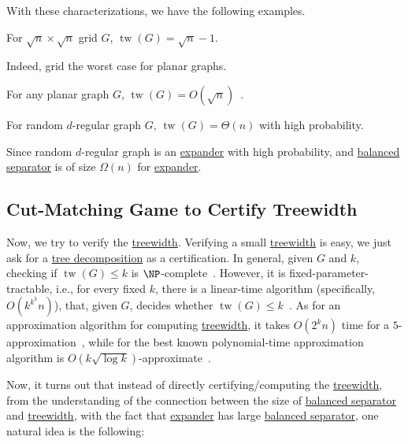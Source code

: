 With these characterizations, we have the following examples.

\begin{eg}[Grid]
	For \(\sqrt{n} \times \sqrt{n} \) grid \(G\), \(\operatorname{tw}(G) = \sqrt{n} - 1 \).
\end{eg}

Indeed, grid the worst case for planar graphs.

\begin{eg}\label{eg:planar-separator-theorem}
	For any planar graph \(G\), \(\operatorname{tw}(G) = O(\sqrt{n} )\)~\cite{lipton1979separator}.
\end{eg}

\begin{eg}
	For random \(d\)-regular graph \(G\), \(\operatorname{tw}(G) = \Theta (n)\) with high probability.
\end{eg}
\begin{explanation}
	Since random \(d\)-regular graph is an \hyperref[def:expander]{expander} with high probability, and \hyperref[def:balanced-separator]{balanced separator} is of size \(\Omega (n)\) for \hyperref[def:expander]{expander}.
\end{explanation}

\subsection{Cut-Matching Game to Certify Treewidth}
Now, we try to verify the \hyperref[def:treewidth]{treewidth}. Verifying a small \hyperref[def:treewidth]{treewidth} is easy, we just ask for a \hyperref[def:tree-decomposition]{tree decomposition} as a certification. In general, given \(G\) and \(k\), checking if \(\operatorname{tw}(G) \leq k\) is \(\NP\)-complete~\cite{arnborg1987complexity}. However, it is fixed-parameter-tractable, i.e., for every fixed \(k\), there is a linear-time algorithm (specifically, \(O(k^{k^3} n)\)), that, given \(G\), decides whether \(\operatorname{tw}(G) \leq k\)~\cite{bodlaender1993linear}. As for an approximation algorithm for computing \hyperref[def:treewidth]{treewidth}, it takes \(O(2^k n)\) time for a \(5\)-approximation~\cite{bodlaender2016c}, while for the best known polynomial-time approximation algorithm is \(O(k \sqrt{\log k} )\)-approximate~\cite{feige2005improved}.

Now, it turns out that instead of directly certifying/computing the \hyperref[def:treewidth]{treewidth}, from the understanding of the connection between the size of \hyperref[def:balanced-separator]{balanced separator} and \hyperref[def:treewidth]{treewidth}, with the fact that \hyperref[def:expander]{expander} has large \hyperref[def:balanced-separator]{balanced separator}, one natural idea is the following:

